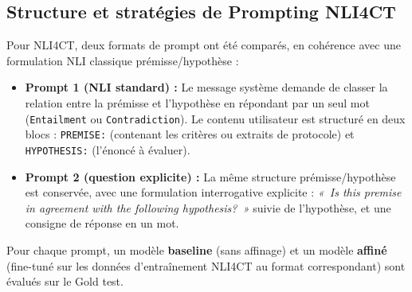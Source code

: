 \documentclass[10pt,twoside]{article}
\begin{document}
\subsection{Structure et stratégies de Prompting NLI4CT}
Pour NLI4CT, deux formats de prompt ont été comparés, en cohérence avec une formulation NLI classique prémisse/hypothèse :
\begin{itemize}
    \item \textbf{Prompt 1 (NLI standard) :} Le message système demande de classer la relation entre la prémisse et l'hypothèse en répondant par un seul mot (\texttt{Entailment} ou \texttt{Contradiction}). Le contenu utilisateur est structuré en deux blocs : \texttt{PREMISE:} (contenant les critères ou extraits de protocole) et \texttt{HYPOTHESIS:} (l'énoncé à évaluer).
    \item \textbf{Prompt 2 (question explicite) :} La même structure prémisse/hypothèse est conservée, avec une formulation interrogative explicite : \textit{«~Is this premise in agreement with the following hypothesis?~»} suivie de l'hypothèse, et une consigne de réponse en un mot.
\end{itemize}
Pour chaque prompt, un modèle \textbf{baseline} (sans affinage) et un modèle \textbf{affiné} (fine-tuné sur les données d'entraînement NLI4CT au format correspondant) sont évalués sur le Gold test.
\end{document}

